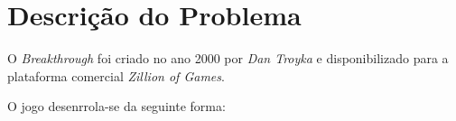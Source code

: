 \documentclass[15pt,a4paper]{article}
\begin{document}


\newpage

\section{Descrição do Problema}

O \textit{Breakthrough} foi criado no ano 2000 por \textit{Dan Troyka}  e disponibilizado para a plataforma comercial \textit{Zillion of Games}.

O jogo desenrrola-se da seguinte forma:
\end{document}
